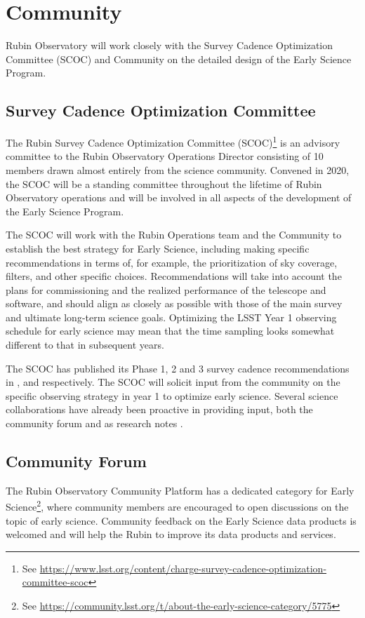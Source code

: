 \section{Community}
\label{sec:community}
Rubin Observatory will work closely with the Survey Cadence Optimization Committee (SCOC) and Community on the detailed design of the Early Science Program.

\subsection{Survey Cadence Optimization Committee}
The Rubin Survey Cadence Optimization Committee (SCOC)\footnote{See \url{https://www.lsst.org/content/charge-survey-cadence-optimization-committee-scoc}} is an advisory committee to the Rubin Observatory Operations Director consisting of 10 members drawn almost entirely from the science community.
Convened in 2020, the SCOC will be a standing committee throughout the lifetime of Rubin Observatory operations and will be involved in all aspects of the development of the Early Science Program.

The SCOC will work with the Rubin Operations team and the Community to establish the best strategy for Early Science, including making specific recommendations in terms of, for example, the prioritization of sky coverage, filters, and other specific choices.
Recommendations will take into account the plans for commissioning and the realized performance of the telescope and software, and should align as closely as possible with those of the main survey and ultimate long-term science goals.
Optimizing the LSST Year 1 observing schedule for early science may mean that the time sampling looks somewhat different to that in subsequent years.

The SCOC has published its Phase 1, 2  and 3 survey cadence recommendations in ,  and  respectively.
The SCOC will solicit input from the community on the specific observing strategy in year 1 to optimize early science.
Several science collaborations have already been proactive in providing input,  both the community forum and as research notes \citep{2021RNAAS...5..143S,2020RNAAS...4...40H,2020RNAAS...4...41S}.


\subsection{Community Forum}
\label{ssec:forum}
The Rubin Observatory Community Platform has a dedicated category for Early Science\footnote{See \url{https://community.lsst.org/t/about-the-early-science-category/5775}}, where community members are encouraged to open discussions on the topic of early science.
Community feedback on the Early Science data products is welcomed and will help the Rubin to improve its data products and services.
